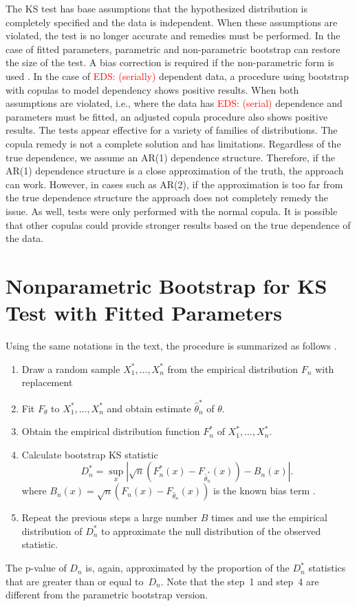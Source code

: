 \documentclass[12pt, letterpaper, titlepage]{article}
\newcommand{\eds}[1]{\textcolor{red}{EDS: (#1)}}
\begin{document}
The KS test has base assumptions that the hypothesized distribution is
completely specified and the data is independent. When these assumptions are
violated, the test is no longer accurate and remedies must be performed. In the
case of fitted parameters, parametric and non-parametric bootstrap can restore
the size of the test. A bias correction is required if the non-parametric form
is used \citep{babu2004goodness}. In the case of \eds{serially} dependent data, a procedure
using bootstrap
with copulas to model dependency shows positive results. When both assumptions
are violated, i.e., where the data has \eds{serial} dependence and parameters
must
be fitted, an adjusted copula procedure also shows positive results. The tests
appear effective for a variety of families of distributions. The copula remedy
is not a complete solution and has limitations. Regardless of the true
dependence, we assume an AR(1) dependence structure. Therefore, if the AR(1)
dependence structure is a close approximation of the truth, the approach can work.
However, in cases such as AR(2), if the approximation is too far from the true
dependence structure the approach does not completely remedy the issue. As well,
tests were only performed with the normal copula. It is possible that other
copulas could provide stronger results based on the true dependence of the data.

\appendix

\section{Nonparametric Bootstrap for KS Test with Fitted Parameters}

Using the same notations in the text, the procedure is summarized as follows
\citep{babu2004goodness}.
\begin{enumerate}
\item
  Draw a random sample $X_1^*,...,X_n^*$ from the empirical distribution $F_n$
  with replacement
\item
  Fit $F_\theta$ to $X_1^*,...,X_n^*$ and obtain estimate 
	$\hat\theta_n^*$ of $\theta$.
\item
  Obtain the empirical distribution function $F_n^*$ of
  $X_1^*, \ldots,  X_n^*$. 
\item
  Calculate bootstrap KS statistic
  \[
    D_n^* = \sup_x | \sqrt{n}\left(F_n^* (x)- F_{\hat\theta_n^*}(x)\right) - B_n(x) |.
  \]
  where $B_{n}(x) = \sqrt{n}(F_{n}(x) - F_{\hat\theta_n}(x))$ is the known
  bias term \citep{babu2004goodness}.
\item
  Repeat the previous steps a large number $B$ times and use the empirical
  distribution of $D_n^*$ to approximate the null distribution of the observed
  statistic. 
\end{enumerate}
The p-value of $D_n$ is, again, approximated by the proportion of the $D_n^*$
statistics that are greater than or equal to~$D_n$. Note that the step~1 and
step~4 are different from the parametric bootstrap version.



\end{document}

